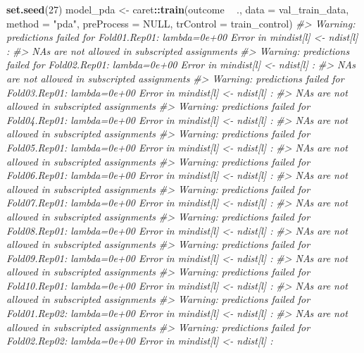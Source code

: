 \documentclass[]{book}
\newenvironment{Shaded}{\begin{snugshade}}{\end{snugshade}}
\newcommand{\CommentTok}[1]{\textcolor[rgb]{0.56,0.35,0.01}{\textit{#1}}}
\newcommand{\DataTypeTok}[1]{\textcolor[rgb]{0.13,0.29,0.53}{#1}}
\newcommand{\DecValTok}[1]{\textcolor[rgb]{0.00,0.00,0.81}{#1}}
\newcommand{\KeywordTok}[1]{\textcolor[rgb]{0.13,0.29,0.53}{\textbf{#1}}}
\newcommand{\NormalTok}[1]{#1}
\newcommand{\OperatorTok}[1]{\textcolor[rgb]{0.81,0.36,0.00}{\textbf{#1}}}
\newcommand{\OtherTok}[1]{\textcolor[rgb]{0.56,0.35,0.01}{#1}}
\newcommand{\StringTok}[1]{\textcolor[rgb]{0.31,0.60,0.02}{#1}}
\begin{document}
\begin{Shaded}
\begin{Highlighting}[]
\KeywordTok{set.seed}\NormalTok{(}\DecValTok{27}\NormalTok{)}
\NormalTok{model_pda <-}\StringTok{ }\NormalTok{caret}\OperatorTok{::}\KeywordTok{train}\NormalTok{(outcome }\OperatorTok{~}\StringTok{ }\NormalTok{.,}
                             \DataTypeTok{data =}\NormalTok{ val_train_data,}
                             \DataTypeTok{method =} \StringTok{"pda"}\NormalTok{,}
                             \DataTypeTok{preProcess =} \OtherTok{NULL}\NormalTok{,}
                             \DataTypeTok{trControl =}\NormalTok{ train_control)}
\CommentTok{#> Warning: predictions failed for Fold01.Rep01: lambda=0e+00 Error in mindist[l] <- ndist[l] : }
\CommentTok{#>   NAs are not allowed in subscripted assignments}
\CommentTok{#> Warning: predictions failed for Fold02.Rep01: lambda=0e+00 Error in mindist[l] <- ndist[l] : }
\CommentTok{#>   NAs are not allowed in subscripted assignments}
\CommentTok{#> Warning: predictions failed for Fold03.Rep01: lambda=0e+00 Error in mindist[l] <- ndist[l] : }
\CommentTok{#>   NAs are not allowed in subscripted assignments}
\CommentTok{#> Warning: predictions failed for Fold04.Rep01: lambda=0e+00 Error in mindist[l] <- ndist[l] : }
\CommentTok{#>   NAs are not allowed in subscripted assignments}
\CommentTok{#> Warning: predictions failed for Fold05.Rep01: lambda=0e+00 Error in mindist[l] <- ndist[l] : }
\CommentTok{#>   NAs are not allowed in subscripted assignments}
\CommentTok{#> Warning: predictions failed for Fold06.Rep01: lambda=0e+00 Error in mindist[l] <- ndist[l] : }
\CommentTok{#>   NAs are not allowed in subscripted assignments}
\CommentTok{#> Warning: predictions failed for Fold07.Rep01: lambda=0e+00 Error in mindist[l] <- ndist[l] : }
\CommentTok{#>   NAs are not allowed in subscripted assignments}
\CommentTok{#> Warning: predictions failed for Fold08.Rep01: lambda=0e+00 Error in mindist[l] <- ndist[l] : }
\CommentTok{#>   NAs are not allowed in subscripted assignments}
\CommentTok{#> Warning: predictions failed for Fold09.Rep01: lambda=0e+00 Error in mindist[l] <- ndist[l] : }
\CommentTok{#>   NAs are not allowed in subscripted assignments}
\CommentTok{#> Warning: predictions failed for Fold10.Rep01: lambda=0e+00 Error in mindist[l] <- ndist[l] : }
\CommentTok{#>   NAs are not allowed in subscripted assignments}
\CommentTok{#> Warning: predictions failed for Fold01.Rep02: lambda=0e+00 Error in mindist[l] <- ndist[l] : }
\CommentTok{#>   NAs are not allowed in subscripted assignments}
\CommentTok{#> Warning: predictions failed for Fold02.Rep02: lambda=0e+00 Error in mindist[l] <- ndist[l] : }

\end{Highlighting}
\end{Shaded}
\end{document}
